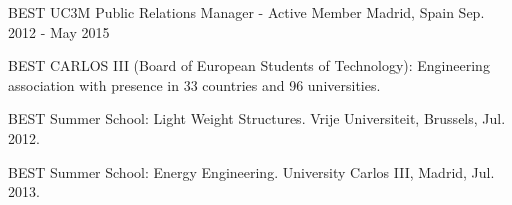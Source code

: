 

\begin{cventries}

  \cventry
    {BEST UC3M} %
    {Public Relations Manager - Active Member} %
    {Madrid, Spain} %
    {Sep. 2012 - May 2015} %
    {
      \begin{cvitems} %
        \item {BEST CARLOS III (Board of European Students of Technology): Engineering association with presence in 33 countries and 96 universities.}
        \item {BEST Summer School: Light Weight Structures. Vrije Universiteit, Brussels, Jul. 2012.}
        \item {BEST Summer School: Energy Engineering. University Carlos III, Madrid, Jul. 2013.}
      \end{cvitems}
    }

\end{cventries}
